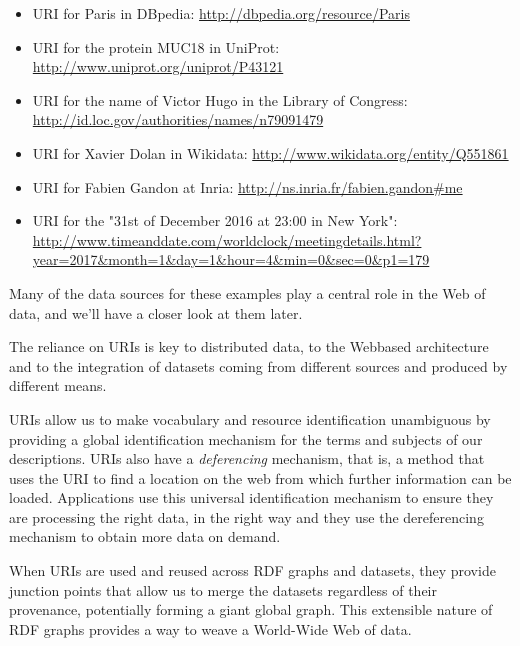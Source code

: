 \begin{itemize}
\item
  URI for Paris in DBpedia: \url{http://dbpedia.org/resource/Paris}
\item
  URI for the protein MUC18 in UniProt:
  \url{http://www.uniprot.org/uniprot/P43121}
\item
  URI for the name of Victor Hugo in the Library of Congress:
  \url{http://id.loc.gov/authorities/names/n79091479}
\item
  URI for Xavier Dolan in Wikidata:
  \url{http://www.wikidata.org/entity/Q551861}
\item
  URI for Fabien Gandon at Inria:
  \url{http://ns.inria.fr/fabien.gandon\#me}
\item
  URI for the "31st of December 2016 at 23:00 in New York":
  \url{http://www.timeanddate.com/worldclock/meetingdetails.html?year=2017\&month=1\&day=1\&hour=4\&min=0\&sec=0\&p1=179}
\end{itemize}

Many of the data sources for these examples play a central role in the Web of data, and we'll 
have a closer look at them later. 

The reliance on URIs is key to distributed data, to the Web\-based
architecture and to the integration of datasets coming from different
sources and produced by different means.

URIs  allow us to make  vocabulary and  resource
identification unambiguous by providing a global identification
mechanism for the terms and subjects of our descriptions. URIs also have a 
\emph{deferencing} mechanism, that is, a method that uses the URI to find a location 
on the web from which further information can be loaded. 
Applications use this universal
identification mechanism to ensure they are processing the right data,
in the right way and they use the dereferencing mechanism to obtain more
data on demand.

When URIs are used and reused across RDF graphs and datasets, they
provide junction points that allow us to merge the datasets regardless
of their provenance, potentially forming a  giant global graph. This
extensible nature of RDF graphs provides a way to weave a World-Wide Web
of data.


